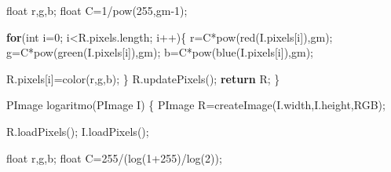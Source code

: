 \documentclass[
]{article}
\newenvironment{Shaded}{}{}
\newcommand{\ControlFlowTok}[1]{\textcolor[rgb]{0.00,0.44,0.13}{\textbf{#1}}}
\newcommand{\DataTypeTok}[1]{\textcolor[rgb]{0.56,0.13,0.00}{#1}}
\newcommand{\DecValTok}[1]{\textcolor[rgb]{0.25,0.63,0.44}{#1}}
\newcommand{\FunctionTok}[1]{\textcolor[rgb]{0.02,0.16,0.49}{#1}}
\newcommand{\NormalTok}[1]{#1}
\newcommand{\OperatorTok}[1]{\textcolor[rgb]{0.40,0.40,0.40}{#1}}
\begin{document}
\begin{Shaded}
\begin{Highlighting}[]
  \DataTypeTok{float}\NormalTok{ r}\OperatorTok{,}\NormalTok{g}\OperatorTok{,}\NormalTok{b}\OperatorTok{;}
  \DataTypeTok{float}\NormalTok{ C}\OperatorTok{=}\DecValTok{1}\OperatorTok{/}\FunctionTok{pow}\OperatorTok{(}\DecValTok{255}\OperatorTok{,}\NormalTok{gm}\OperatorTok{{-}}\DecValTok{1}\OperatorTok{);}
  
  \ControlFlowTok{for}\OperatorTok{(}\DataTypeTok{int}\NormalTok{ i}\OperatorTok{=}\DecValTok{0}\OperatorTok{;}\NormalTok{ i}\OperatorTok{\textless{}}\NormalTok{R}\OperatorTok{.}\FunctionTok{pixels}\OperatorTok{.}\FunctionTok{length}\OperatorTok{;}\NormalTok{ i}\OperatorTok{++)\{}
\NormalTok{    r}\OperatorTok{=}\NormalTok{C}\OperatorTok{*}\FunctionTok{pow}\OperatorTok{(}\FunctionTok{red}\OperatorTok{(}\NormalTok{I}\OperatorTok{.}\FunctionTok{pixels}\OperatorTok{[}\NormalTok{i}\OperatorTok{]),}\NormalTok{gm}\OperatorTok{);}
\NormalTok{    g}\OperatorTok{=}\NormalTok{C}\OperatorTok{*}\FunctionTok{pow}\OperatorTok{(}\FunctionTok{green}\OperatorTok{(}\NormalTok{I}\OperatorTok{.}\FunctionTok{pixels}\OperatorTok{[}\NormalTok{i}\OperatorTok{]),}\NormalTok{gm}\OperatorTok{);}
\NormalTok{    b}\OperatorTok{=}\NormalTok{C}\OperatorTok{*}\FunctionTok{pow}\OperatorTok{(}\FunctionTok{blue}\OperatorTok{(}\NormalTok{I}\OperatorTok{.}\FunctionTok{pixels}\OperatorTok{[}\NormalTok{i}\OperatorTok{]),}\NormalTok{gm}\OperatorTok{);}
    
\NormalTok{    R}\OperatorTok{.}\FunctionTok{pixels}\OperatorTok{[}\NormalTok{i}\OperatorTok{]=}\FunctionTok{color}\OperatorTok{(}\NormalTok{r}\OperatorTok{,}\NormalTok{g}\OperatorTok{,}\NormalTok{b}\OperatorTok{);}
  \OperatorTok{\}}
\NormalTok{  R}\OperatorTok{.}\FunctionTok{updatePixels}\OperatorTok{();}
  \ControlFlowTok{return}\NormalTok{ R}\OperatorTok{;}
\OperatorTok{\}}

\NormalTok{PImage }\FunctionTok{logaritmo}\OperatorTok{(}\NormalTok{PImage I}\OperatorTok{)}
\OperatorTok{\{}
\NormalTok{  PImage R}\OperatorTok{=}\FunctionTok{createImage}\OperatorTok{(}\NormalTok{I}\OperatorTok{.}\FunctionTok{width}\OperatorTok{,}\NormalTok{I}\OperatorTok{.}\FunctionTok{height}\OperatorTok{,}\NormalTok{RGB}\OperatorTok{);}
  
\NormalTok{  R}\OperatorTok{.}\FunctionTok{loadPixels}\OperatorTok{();}
\NormalTok{  I}\OperatorTok{.}\FunctionTok{loadPixels}\OperatorTok{();}
  
  \DataTypeTok{float}\NormalTok{ r}\OperatorTok{,}\NormalTok{g}\OperatorTok{,}\NormalTok{b}\OperatorTok{;}
  \DataTypeTok{float}\NormalTok{ C}\OperatorTok{=}\DecValTok{255}\OperatorTok{/(}\FunctionTok{log}\OperatorTok{(}\DecValTok{1}\OperatorTok{+}\DecValTok{255}\OperatorTok{)/}\FunctionTok{log}\OperatorTok{(}\DecValTok{2}\OperatorTok{));}
  

\end{Highlighting}
\end{Shaded}
\end{document}
